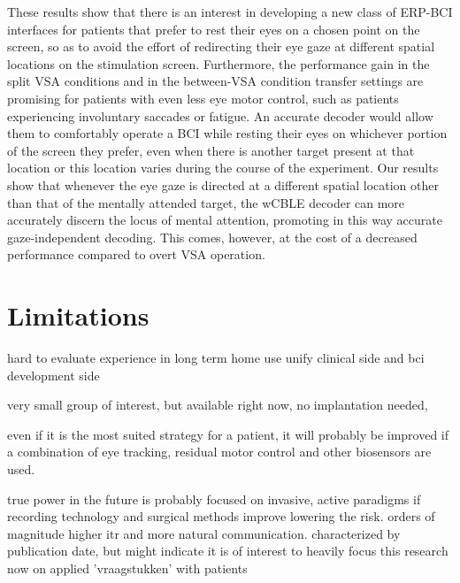 These results show that there is an interest in developing a new class of ERP-BCI
interfaces for patients that prefer to rest their eyes on a chosen point on the
screen, so as to avoid the effort of redirecting their eye gaze at different spatial locations on
the stimulation screen. Furthermore, the performance gain in the split VSA conditions
and in the between-VSA condition transfer settings are promising for patients with even
less eye motor control, such as patients experiencing involuntary saccades or
fatigue. An accurate decoder would allow them to comfortably operate a BCI while
resting their eyes on whichever portion of the screen they prefer, even when there is
another target present at that location or this location varies during the course of the
experiment. Our results show that whenever the eye gaze is directed at a different
spatial location other than that of the mentally attended target, the wCBLE decoder can
more accurately discern the locus of mental attention, promoting in this way accurate
gaze-independent decoding. This comes, however, at the cost of a decreased performance
compared to overt VSA operation.



\section{Limitations}

hard to evaluate experience in long term home use
unify clinical side and bci development side

very small group of interest, but available right now, no implantation needed,

even if it is the most suited strategy for a patient, it will probably be
improved if a combination of eye tracking, residual motor control and other
biosensors are used.

true power in the future is probably focused on
invasive, active paradigms if recording technology and surgical methods
improve lowering the risk. orders of magnitude higher itr and more natural
communication.
characterized by publication date, but might indicate it is of interest to
heavily focus this research now on applied 'vraagstukken' with patients


